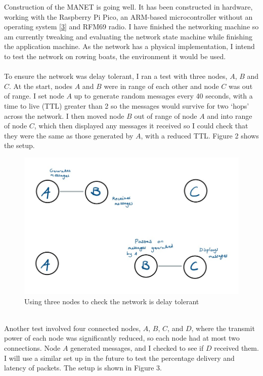 \documentclass[10pt, a4paper]{article}
\begin{document}
Construction of the MANET is going well. It has been constructed in hardware, working with the Raspberry Pi Pico, an ARM-based microcontroller without an operating system \hyperref[pico]{[3]} and RFM69 radio. I have finished the networking machine so am currently tweaking and evaluating the network state machine while finishing the application machine. As the network has a physical implementation, I intend to test the network on rowing boats, the environment it would be used. \\ \\
To ensure the network was delay tolerant, I ran a test with three nodes, $A$, $B$ and $C$. At the start, nodes $A$ and $B$ were in range of each other and node $C$ was out of range. I set node $A$ up to generate random messages every 40 seconds, with a time to live (TTL) greater than 2 so the messages would survive for two `hops' across the network. I then moved node $B$ out of range of node $A$ and into range of node $C$, which then displayed any messages it received so I could check that they were the same as those generated by $A$, with a reduced TTL. Figure 2 shows the setup.
\begin{figure}[h]
\caption{Using three nodes to check the network is delay tolerant}
\begin{center}
\includegraphics[scale=0.4]{test1.jpg}
\end{center}
\end{figure} \\
Another test involved four connected nodes, $A$, $B$, $C$, and $D$, where the transmit power of each node was significantly reduced, so each node had at most two connections. Node $A$ generated messages, and I checked to see if $D$ received them. I will use a similar set up in the future to test the percentage delivery and latency of packets. The setup is shown in Figure 3.
\end{document}
